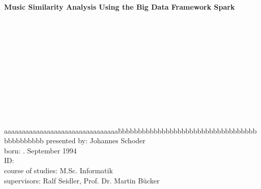 \documentclass[a4paper,oneside,12pt]{report}
\makeatletter
\newcommand\frontmatter{%
    \cleardoublepage
  \pagenumbering{roman}}
\makeatother
\begin{document}
\begin{center}
\end{center}
\begin{center}
\begin{Large}
\textbf{Music Similarity Analysis Using the Big Data Framework Spark}
\end{Large}
\end{center}
\ \\
\ \\
\ \\
\ \\
\ \\
\ \\
\ \\
\ \\
\ \\
\ \\
\flushleft
\begin{tabbing}
aaaaaaaaaaaaaaaaaaaaaaaaaaaaaaaa\= bbbbbbbbbbbbbbbbbbbbbbbbbbbbbbbbbbbbbbbbbbbbb\kill
presented by: \>Johannes Schoder\\
born: . September 1994\\
ID: \\
course of studies: \>M.Sc. Informatik\\
supervisors: \>Ralf Seidler, Prof. Dr. Martin B\"ucker\\
\end{tabbing}




\frontmatter %
\pagestyle{plain} %



\newpage
\tableofcontents %
\pagestyle{plain} 

\end{document}
